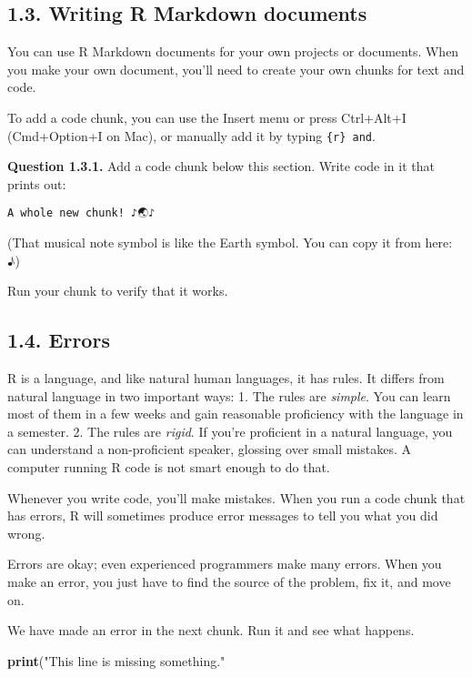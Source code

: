 \documentclass[
]{article}
\newenvironment{Shaded}{\begin{snugshade}}{\end{snugshade}}
\newcommand{\FunctionTok}[1]{\textcolor[rgb]{0.13,0.29,0.53}{\textbf{#1}}}
\newcommand{\NormalTok}[1]{#1}
\newcommand{\StringTok}[1]{\textcolor[rgb]{0.31,0.60,0.02}{#1}}
\begin{document}
\subsection{1.3. Writing R Markdown
documents}\label{writing-r-markdown-documents}

You can use R Markdown documents for your own projects or documents.
When you make your own document, you'll need to create your own chunks
for text and code.

To add a code chunk, you can use the Insert menu or press Ctrl+Alt+I
(Cmd+Option+I on Mac), or manually add it by typing \texttt{\{r\}\ and}.

\textbf{Question 1.3.1.} Add a code chunk below this section. Write code
in it that prints out:

\begin{verbatim}
A whole new chunk! ♪🌏♪
\end{verbatim}

(That musical note symbol is like the Earth symbol. You can copy it from
here: ♪)

Run your chunk to verify that it works.

\subsection{1.4. Errors}\label{errors}

R is a language, and like natural human languages, it has rules. It
differs from natural language in two important ways: 1. The rules are
\emph{simple}. You can learn most of them in a few weeks and gain
reasonable proficiency with the language in a semester. 2. The rules are
\emph{rigid}. If you're proficient in a natural language, you can
understand a non-proficient speaker, glossing over small mistakes. A
computer running R code is not smart enough to do that.

Whenever you write code, you'll make mistakes. When you run a code chunk
that has errors, R will sometimes produce error messages to tell you
what you did wrong.

Errors are okay; even experienced programmers make many errors. When you
make an error, you just have to find the source of the problem, fix it,
and move on.

We have made an error in the next chunk. Run it and see what happens.

\begin{Shaded}
\begin{Highlighting}[]
\FunctionTok{print}\NormalTok{(}\StringTok{"This line is missing something."}
\end{Highlighting}
\end{Shaded}
\end{document}
